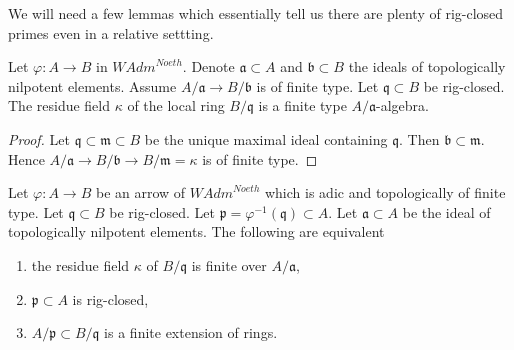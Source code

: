 \noindent
We will need a few lemmas which essentially tell us there are
plenty of rig-closed primes even in a relative settting.

\begin{lemma}
\label{lemma-rig-closed-point-relative-residue-field}
Let $\varphi : A \to B$ in $\textit{WAdm}^{Noeth}$.
Denote $\mathfrak a \subset A$ and $\mathfrak b \subset B$
the ideals of topologically nilpotent elements. Assume
$A/\mathfrak a \to B/\mathfrak b$ is of finite type.
Let $\mathfrak q \subset B$ be rig-closed.
The residue field $\kappa$ of the local ring $B/\mathfrak q$
is a finite type $A/\mathfrak a$-algebra.
\end{lemma}

\begin{proof}
Let $\mathfrak q \subset \mathfrak m \subset B$ be the unique
maximal ideal containing $\mathfrak q$.
Then $\mathfrak b \subset \mathfrak m$. Hence
$A/\mathfrak a \to B/\mathfrak b \to B/\mathfrak m = \kappa$ is
of finite type.
\end{proof}

\begin{lemma}
\label{lemma-rig-closed-point-relative}
Let $\varphi : A \to B$ be an arrow of $\textit{WAdm}^{Noeth}$
which is adic and topologically of finite type.
Let $\mathfrak q \subset B$ be rig-closed.
Let $\mathfrak p = \varphi^{-1}(\mathfrak q) \subset A$.
Let $\mathfrak a \subset A$ be the ideal of topologically nilpotent
elements.
The following are equivalent
\begin{enumerate}
\item the residue field $\kappa$ of $B/\mathfrak q$ is finite
over $A/\mathfrak a$,
\item $\mathfrak p \subset A$ is rig-closed,
\item $A/\mathfrak p \subset B/\mathfrak q$ is a finite extension
of rings.
\end{enumerate}
\end{lemma}

